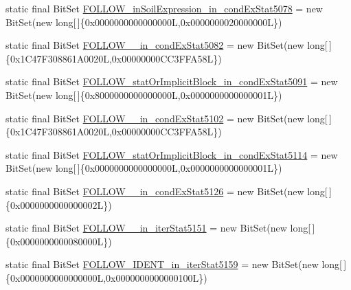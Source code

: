 \begin{DoxyCompactItemize}
\item 
static final Bit\-Set \hyperlink{classorg_1_1tzi_1_1use_1_1parser_1_1shell_1_1_shell_command_parser_a8c7d1be4cda3b2bdc8bc2178227d1088}{F\-O\-L\-L\-O\-W\-\_\-in\-Soil\-Expression\-\_\-in\-\_\-cond\-Ex\-Stat5078} = new Bit\-Set(new long\mbox{[}$\,$\mbox{]}\{0x0000000000000000\-L,0x0000000020000000\-L\})
\item 
static final Bit\-Set \hyperlink{classorg_1_1tzi_1_1use_1_1parser_1_1shell_1_1_shell_command_parser_afb6f173d1bb469ec142345873682be11}{F\-O\-L\-L\-O\-W\-\_\-\_\-in\-\_\-cond\-Ex\-Stat5082} = new Bit\-Set(new long\mbox{[}$\,$\mbox{]}\{0x1\-C47\-F308861\-A0020\-L,0x00000000\-C\-C3\-F\-F\-A58\-L\})
\item 
static final Bit\-Set \hyperlink{classorg_1_1tzi_1_1use_1_1parser_1_1shell_1_1_shell_command_parser_a264c850d0a5db808fc54ef89208144ae}{F\-O\-L\-L\-O\-W\-\_\-stat\-Or\-Implicit\-Block\-\_\-in\-\_\-cond\-Ex\-Stat5091} = new Bit\-Set(new long\mbox{[}$\,$\mbox{]}\{0x8000000000000000\-L,0x0000000000000001\-L\})
\item 
static final Bit\-Set \hyperlink{classorg_1_1tzi_1_1use_1_1parser_1_1shell_1_1_shell_command_parser_a4cc7964b9f17b509cd6e0eb84d1d8296}{F\-O\-L\-L\-O\-W\-\_\-\_\-in\-\_\-cond\-Ex\-Stat5102} = new Bit\-Set(new long\mbox{[}$\,$\mbox{]}\{0x1\-C47\-F308861\-A0020\-L,0x00000000\-C\-C3\-F\-F\-A58\-L\})
\item 
static final Bit\-Set \hyperlink{classorg_1_1tzi_1_1use_1_1parser_1_1shell_1_1_shell_command_parser_a457f52d2b2f89ea978f32c5a961ec411}{F\-O\-L\-L\-O\-W\-\_\-stat\-Or\-Implicit\-Block\-\_\-in\-\_\-cond\-Ex\-Stat5114} = new Bit\-Set(new long\mbox{[}$\,$\mbox{]}\{0x0000000000000000\-L,0x0000000000000001\-L\})
\item 
static final Bit\-Set \hyperlink{classorg_1_1tzi_1_1use_1_1parser_1_1shell_1_1_shell_command_parser_af109b518205c9a9479c1447f5379e628}{F\-O\-L\-L\-O\-W\-\_\-\_\-in\-\_\-cond\-Ex\-Stat5126} = new Bit\-Set(new long\mbox{[}$\,$\mbox{]}\{0x0000000000000002\-L\})
\item 
static final Bit\-Set \hyperlink{classorg_1_1tzi_1_1use_1_1parser_1_1shell_1_1_shell_command_parser_a064c9e7104a8f4e73f6f286c1b2d013f}{F\-O\-L\-L\-O\-W\-\_\-\_\-in\-\_\-iter\-Stat5151} = new Bit\-Set(new long\mbox{[}$\,$\mbox{]}\{0x0000000000080000\-L\})
\item 
static final Bit\-Set \hyperlink{classorg_1_1tzi_1_1use_1_1parser_1_1shell_1_1_shell_command_parser_a476813bff28f253575f1e600a79d48ef}{F\-O\-L\-L\-O\-W\-\_\-\-I\-D\-E\-N\-T\-\_\-in\-\_\-iter\-Stat5159} = new Bit\-Set(new long\mbox{[}$\,$\mbox{]}\{0x0000000000000000\-L,0x0000000000000100\-L\})

\end{DoxyCompactItemize}
